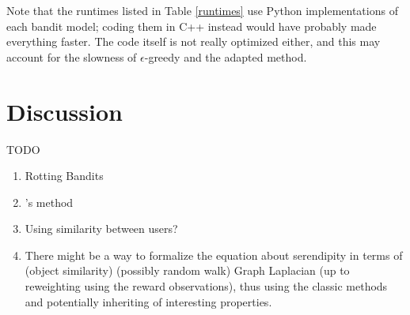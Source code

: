 \documentclass{article}
\begin{document}
Note that the runtimes listed in Table \ref{runtimes} use Python implementations of each bandit model; coding them in C++ instead would have probably made everything faster. The code itself is not really optimized either, and this may account for the slowness of $\epsilon$-greedy and the adapted method.


\section{Discussion}

TODO

\begin{enumerate}
\item Rotting Bandits
\item \cite{abbassi2009getting}'s method
\item Using similarity between users?
\item There might be a way to formalize the equation about serendipity in terms of (object similarity) (possibly random walk) Graph Laplacian (up to reweighting using the reward observations), thus using the classic methods and potentially inheriting of interesting properties.
\end{enumerate}




\end{document}
